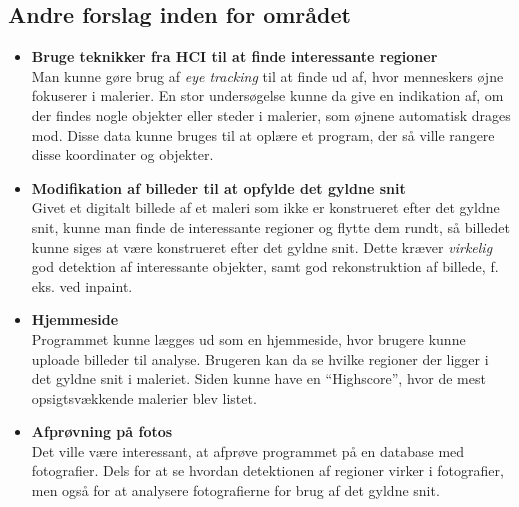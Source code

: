 {\subsection{Andre forslag inden for området}
\begin{itemize}
    \item \textbf{Bruge teknikker fra HCI til at finde interessante regioner}\\
        Man kunne gøre brug af \emph{eye tracking} til at finde ud af,
        hvor menneskers øjne fokuserer i malerier. En stor undersøgelse
        kunne da give en indikation af, om der findes nogle objekter
        eller steder i malerier, som øjnene automatisk drages mod. Disse
        data kunne bruges til at oplære et program, der så ville rangere
        disse koordinater og objekter.
    \item \textbf{Modifikation af billeder til at opfylde det gyldne
        snit}\\
        Givet et digitalt billede af et maleri som ikke er konstrueret
        efter det gyldne snit, kunne man finde de interessante regioner
        og flytte dem rundt, så billedet kunne siges at være konstrueret
        efter det gyldne snit. Dette kræver \emph{virkelig} god
        detektion af interessante objekter, samt god rekonstruktion af
        billede, f. eks. ved inpaint.
    \item \textbf{Hjemmeside}\\
        Programmet kunne lægges ud som en hjemmeside, hvor brugere kunne
        uploade billeder til analyse. Brugeren kan da se hvilke regioner
        der ligger i det gyldne snit i maleriet. Siden kunne have en
        ``Highscore'', hvor de mest opsigtsvækkende malerier blev
        listet.
    \item \textbf{Afprøvning på fotos}\\
        Det ville være interessant, at afprøve programmet på en database
        med fotografier. Dels for at se hvordan detektionen af regioner
        virker i fotografier, men også for at analysere fotografierne
        for brug af det gyldne snit.
\end{itemize}

}

